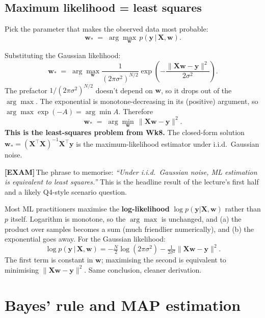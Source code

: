 \documentclass[11pt, a4paper]{article}
\newcommand{\examflag}{\textcolor{tipBd}{\textbf{[EXAM]}}\,}
\begin{document}
\subsection{Maximum likelihood = least squares}

\begin{defbox}
Pick the parameter that makes the observed data most probable:
\[
\mathbf{w}_* \;=\; \arg\max_\mathbf{w}\, p(\mathbf{y}\,|\,\mathbf{X},\mathbf{w}).
\]
\end{defbox}

Substituting the Gaussian likelihood:
\[
\mathbf{w}_* \;=\; \arg\max_\mathbf{w} \frac{1}{(2\pi\sigma^2)^{N/2}}\exp\!\left(-\frac{\|\mathbf{X}\mathbf{w}-\mathbf{y}\|^2}{2\sigma^2}\right).
\]
The prefactor $1/(2\pi\sigma^2)^{N/2}$ doesn't depend on $\mathbf{w}$, so it drops out of the $\arg\max$. The exponential is monotone-decreasing in its (positive) argument, so $\arg\max\exp(-A) = \arg\min A$. Therefore
\[
\mathbf{w}_* \;=\; \arg\min_\mathbf{w}\,\|\mathbf{X}\mathbf{w}-\mathbf{y}\|^2.
\]
\textbf{This is the least-squares problem from Wk8.} The closed-form solution $\mathbf{w}_* = (\mathbf{X}^\top\mathbf{X})^{-1}\mathbf{X}^\top\mathbf{y}$ is the maximum-likelihood estimator under i.i.d.\ Gaussian noise.

\examflag{}The phrase to memorise: \emph{``Under i.i.d.\ Gaussian noise, ML estimation is equivalent to least squares.''} This is the headline result of the lecture's first half and a likely Q4-style scenario question.

\begin{notebox}
Most ML practitioners maximise the \textbf{log-likelihood} $\log p(\mathbf{y}|\mathbf{X},\mathbf{w})$ rather than $p$ itself. Logarithm is monotone, so the $\arg\max$ is unchanged, and (a) the product over samples becomes a sum (much friendlier numerically), and (b) the exponential goes away. For the Gaussian likelihood:
\[
\log p(\mathbf{y}\,|\,\mathbf{X},\mathbf{w}) = -\tfrac{N}{2}\log(2\pi\sigma^2) - \tfrac{1}{2\sigma^2}\|\mathbf{X}\mathbf{w}-\mathbf{y}\|^2.
\]
The first term is constant in $\mathbf{w}$; maximising the second is equivalent to minimising $\|\mathbf{X}\mathbf{w}-\mathbf{y}\|^2$. Same conclusion, cleaner derivation.
\end{notebox}

\section{Bayes' rule and MAP estimation}
\end{document}
